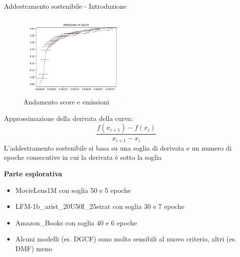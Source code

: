 

\begin{frame}{Addestramento sostenibile - Introduzione}
    \begin{figure}
        \centering
        \includegraphics[width=0.5\textwidth]{images/curve_emissions_score.png}
        \caption{Andamento score e emissioni}
    \end{figure}
    \scriptsize    
Approssimazione della derivata della curva:
\begin{equation*}
    \frac{f(x_{i+1}) - f(x_i)}{x_{i+1} - x_i}
\end{equation*}
L'addestramento sostenibile si basa su una soglia di derivata e un numero di epoche consecutive in cui la derivata è sotto la soglia

\textbf{Parte esplorativa}
    \begin{itemize}
        \item MovieLens1M con soglia 50 e 5 epoche
        \item LFM-1b\_arist\_20U50I\_25strat con soglia 30 e 7 epoche
        \item Amazon\_Books con soglia 40 e 6 epoche
        \item Alcuni modelli (es. DGCF) sono molto sensibili al nuovo criterio, altri (es. DMF) meno
    \end{itemize}
\end{frame}

